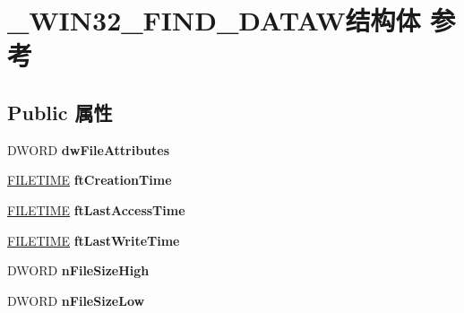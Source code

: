 \hypertarget{struct___w_i_n32___f_i_n_d___d_a_t_a_w}{}\section{\+\_\+\+W\+I\+N32\+\_\+\+F\+I\+N\+D\+\_\+\+D\+A\+T\+A\+W结构体 参考}
\label{struct___w_i_n32___f_i_n_d___d_a_t_a_w}
\subsection*{Public 属性}
\begin{DoxyCompactItemize}
\item 
\mbox{\label{struct___w_i_n32___f_i_n_d___d_a_t_a_w_aa322ad91e70d397610566082afd8fb21}} 
D\+W\+O\+RD {\bfseries dw\+File\+Attributes}
\item 
\mbox{\label{struct___w_i_n32___f_i_n_d___d_a_t_a_w_ae49e2832cc0f363d569b9eb429ce4032}} 
\hyperlink{struct___f_i_l_e_t_i_m_e}{F\+I\+L\+E\+T\+I\+ME} {\bfseries ft\+Creation\+Time}
\item 
\mbox{\label{struct___w_i_n32___f_i_n_d___d_a_t_a_w_ad686e1cf9d0875ccd5f9467c7163726c}} 
\hyperlink{struct___f_i_l_e_t_i_m_e}{F\+I\+L\+E\+T\+I\+ME} {\bfseries ft\+Last\+Access\+Time}
\item 
\mbox{\label{struct___w_i_n32___f_i_n_d___d_a_t_a_w_a2666086a5ea3d4b496a5559f5b9436f7}} 
\hyperlink{struct___f_i_l_e_t_i_m_e}{F\+I\+L\+E\+T\+I\+ME} {\bfseries ft\+Last\+Write\+Time}
\item 
\mbox{\label{struct___w_i_n32___f_i_n_d___d_a_t_a_w_a4fdb699f9f6a8e548aa5f8c1f17c2122}} 
D\+W\+O\+RD {\bfseries n\+File\+Size\+High}
\item 
\mbox{\label{struct___w_i_n32___f_i_n_d___d_a_t_a_w_a4fa447876b385e44ffd328be3e3bb339}} 
D\+W\+O\+RD {\bfseries n\+File\+Size\+Low}
\item 
\mbox{\label{struct___w_i_n32___f_i_n_d___d_a_t_a_w_a68a885a48f9a855b143a3a80231f2c34}} 

\end{DoxyCompactItemize}

